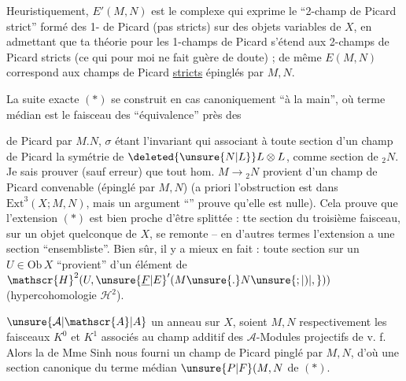 Heuristiquement, $E'(M,N)$ est le complexe qui exprime le ``2-champ de Picard strict'' formé des 1- de Picard (pas  stricts)  sur des objets variables de $X$, en admettant que ta théorie pour les 1-champs de Picard  s'étend aux 2-champs de Picard stricts (ce qui pour  moi ne fait guère de doute) ; de même $E(M,N)$ correspond aux champs de Picard \uline{stricts} épinglés par $M,N$.

La suite exacte $(*)$ se construit en  cas canoniquement ``à la main'', où  terme médian est le faisceau des   ``équivalence'' près des


\margin{\mbox{-- --}}

 de Picard  par $M.N$, $\sigma$ étant l'invariant qui  associant à toute section  d'un champ de Picard la symétrie de $\deleted{\unsure{N|L}}L\otimes L$,  comme section de ${}_{2}N$. Je sais prouver (sauf erreur) que tout hom. $M\to{}_{2}N$ provient d'un champ de Picard convenable (épinglé par $M,N$) (a priori l'obstruction est dans $\mathrm{Ext}^{3}(X;M,N)$, mais un argument ``'' prouve qu'elle est nulle). Cela prouve que l'extension $(*)$ est bien proche d'être splittée :  tte section du troisième faisceau, sur un objet quelconque de $X$, se remonte -- en d'autres termes l'extension a une section ``ensembliste''. Bien sûr, il y a mieux en fait : toute section sur un $U\in\mathrm{Ob}\,X$ ``provient'' d'un élément de $\mathscr{H}^{2}(U,{\unsure{\underline{F}|E}}'(M\unsure{.}N\unsure{;|)|,}))$ (hypercohomologie $\mathscr{H}^{2}$).



\uline{}\unsure{:|,}  $\unsure{\mathcal{A}|\mathscr{A}|A}$ un anneau sur $X$, soient $M,N$ respectivement les faisceaux $K^{0}$ et $K^{1}$ associés au champ additif des $\mathcal{A}$-Modules projectifs de v. f.  Alors la  de Mme Sinh nous fourni un champ de Picard pinglé par $M,N$, d'où une section  canonique du terme médian $\unsure{P|F}(M,N$ de $(*)$.

